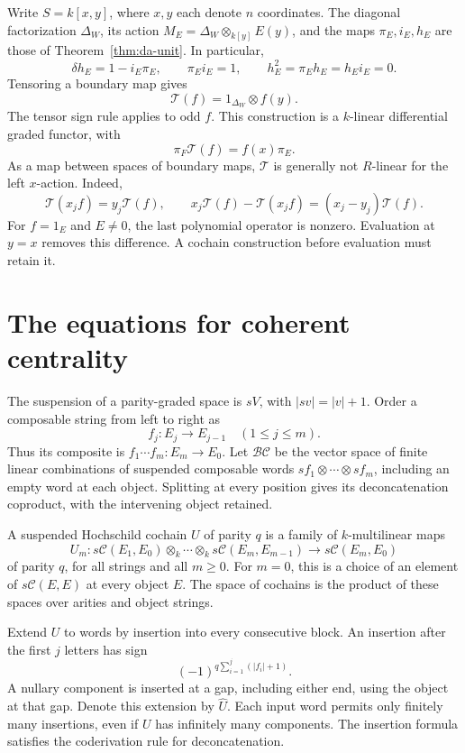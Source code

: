 Write \(S=k[x,y]\), where \(x,y\) each denote \(n\) coordinates.
The diagonal factorization \(\Delta_W\), its action
\(M_E=\Delta_W\otimes_{k[y]}E(y)\), and the maps
\(\pi_E,i_E,h_E\) are those of Theorem~\ref{thm:da-unit}.
In particular,
\[
 \delta h_E=1-i_E\pi_E,\qquad
 \pi_Ei_E=1,\qquad h_E^2=\pi_Eh_E=h_Ei_E=0.
\]
Tensoring a boundary map gives
\[
 \mathcal T(f)=1_{\Delta_W}\otimes f(y).
\]
The tensor sign rule applies to odd \(f\). This construction is
a \(k\)-linear differential graded functor, with
\[
 \pi_F\mathcal T(f)=f(x)\pi_E.
\]
As a map between spaces of boundary maps, \(\mathcal T\) is
generally not \(R\)-linear for the left \(x\)-action. Indeed,
\[
 \mathcal T(x_jf)=y_j\mathcal T(f),\qquad
 x_j\mathcal T(f)-\mathcal T(x_jf)
       =(x_j-y_j)\mathcal T(f).
\]
For \(f=1_E\) and \(E\ne0\), the last polynomial operator is
nonzero. Evaluation at \(y=x\) removes this difference. A
cochain construction before evaluation must retain it.

\section{The equations for coherent centrality}
\label{sec:cc-cochains}

The suspension of a parity-graded space is \(sV\), with
\(|sv|=|v|+1\). Order a composable string from left to right as
\[
 f_j:E_j\longrightarrow E_{j-1}\quad(1\leq j\leq m).
\]
Thus its composite is \(f_1\cdots f_m:E_m\to E_0\).
Let \(\mathcal B\mathcal C\) be the vector space of finite
linear combinations of suspended composable words
\(sf_1\otimes\cdots\otimes sf_m\), including an empty word at
each object. Splitting at every position gives its
deconcatenation coproduct, with the intervening object retained.

A suspended Hochschild cochain \(U\) of parity \(q\) is a family
of \(k\)-multilinear maps
\[
 U_m:
 s\mathcal C(E_1,E_0)\otimes_k\cdots\otimes_k
 s\mathcal C(E_m,E_{m-1})
 \longrightarrow s\mathcal C(E_m,E_0)
\]
of parity \(q\), for all strings and all \(m\geq0\).
For \(m=0\), this is a choice of an element of
\(s\mathcal C(E,E)\) at every object \(E\).
The space of cochains is the product of these spaces over
arities and object strings.

Extend \(U\) to words by insertion into every consecutive block.
An insertion after the first \(j\) letters has sign
\[
 (-1)^{q\sum_{i=1}^j(|f_i|+1)}.
\]
A nullary component is inserted at a gap, including either end,
using the object at that gap. Denote this extension by
\(\widehat U\). Each input word permits only finitely many
insertions, even if \(U\) has infinitely many components.
The insertion formula satisfies the coderivation rule for
deconcatenation.

